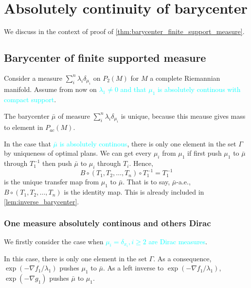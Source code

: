 \section{Absolutely continuity of barycenter}

We discuss in the context of proof of \cref{thm:barycenter_finite_support_measure}.

\subsection{Barycenter of finite supported measure}

Consider a measure $\sum_{i}^{n} \lambda_{i} \delta_{\mu_i}$ on $P_{2}(M)$ for $M$ a complete Riemannian manifold.
Assume from now on \textcolor{cyan}{$ \lambda_1 \neq 0$ and
	that $\mu_1$ is absolutely continous with compact support}.


The barycenter $\bar{\mu}$ of measure $\sum_{i}^{n} \lambda_{i} \delta_{\mu_i}$ is unique,
because this meause gives mass to element in $P_{ac}(M)$.

In the case that \textcolor{cyan}{$\bar{\mu}$ is absolutely continous},
there is only one element in the set $\Gamma$ by uniqueness of optimal plans.
We can get every $\mu_i$ from $\mu_1$ if first push $\mu_1$ to $\bar{\mu}$ through $T_1^{-1}$ then push $\bar{\mu}$ to $\mu_i$ through $T_i$. Hence,
\[B \circ (T_1, T_2, \ldots, T_n) \circ T_1^{-1} = T_1^{-1}\]
is the unique transfer map from $\mu_1$ to $\bar{\mu}$. That is to say, $\bar{\mu}$-a.e., $B \circ (T_1, T_2, \ldots, T_n) $ is the identity map.
This is already included in \cref{lem:inverse_barycenter}.

\subsubsection{One measure absolutely continous and others Dirac}
We firstly consider the case when \textcolor{cyan}{$\mu_i = \delta_{x_i}, i \geq 2$ are Dirac measures}.

In this case, there is only one element in the set $\Gamma$.
As a consequence, $\exp(-\nabla f_1 / \lambda_1)$ pushes $\mu_1$ to $\bar{\mu}$.
As a left inverse to $\exp(-\nabla f_1/\lambda_1)$,
\(\exp(-\nabla g_1)\) pushes $\bar{\mu}$ to $\mu_1$.

